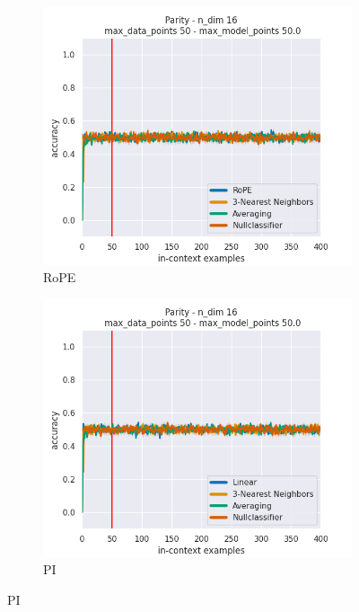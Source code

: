 \documentclass[letterpaper]{article} %
\begin{document}
\begin{figure}[tp]
    \centering
    \begin{subfigure}[t]{0.32\linewidth}
        \includegraphics[width=\linewidth]{AnonymousSubmission/LaTeX/imgs/appendix/parity/rope.png}
        \caption{RoPE}
    \end{subfigure}
    \begin{subfigure}[t]{0.32\linewidth}
        \includegraphics[width=\linewidth]{AnonymousSubmission/LaTeX/imgs/appendix/parity/linear.png}
        \caption{PI}
    \end{subfigure}

\end{figure}
\end{document}
